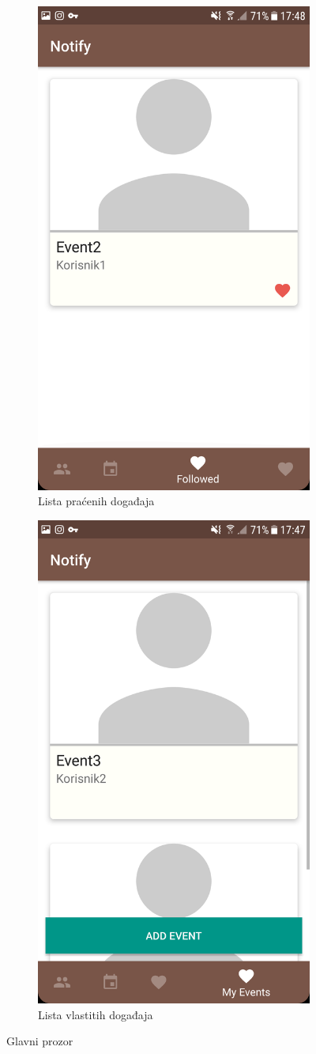 \documentclass[times, utf8, zavrsni]{fer}
\begin{document}
{\begin{figure}
\begin{subfigure}{0.5\linewidth}
	\centering    
    \includegraphics[width=0.45\linewidth]{img/ss-event-list-followed.png} 
    \caption{Lista praćenih događaja}
    \label{fig:event-list-followed-image}
\end{subfigure}%
\begin{subfigure}{0.5\linewidth}
	\centering
    \includegraphics[width=0.45\linewidth]{img/ss-event-list-my.png} 
    \caption{Lista vlastitih događaja}
    \label{fig:event-list-my-image}
\end{subfigure}%
\caption{Glavni prozor}
\label{fig:main-activity-image}
\end{figure}

}
\end{document}
